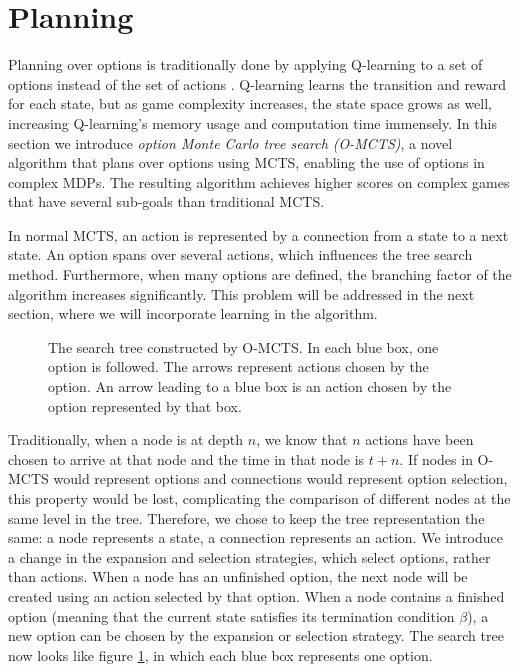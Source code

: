 \section{Planning}
\label{sec:planning}


Planning over options is traditionally done by applying Q-learning to a set of
options instead of the set of actions \cite{sutton1999between}. Q-learning
learns the transition and reward for each state, but as game complexity
increases, the state space grows as well, increasing Q-learning's memory usage
and computation time immensely. In this section we introduce \emph{option Monte
Carlo tree search (O-MCTS)}, a novel algorithm that plans over options using
MCTS, enabling the use of options in complex MDPs.  The resulting algorithm
achieves higher scores on complex games that have several sub-goals than
traditional MCTS.

In normal MCTS, an action is represented by a connection from a state to a next
state. An option spans over several actions, which influences the tree search
method. Furthermore, when many options are defined, the branching factor of the
algorithm increases significantly. This problem will be addressed in the next
section, where we will incorporate learning in the algorithm.

\begin{figure}
	\centering
	\caption{The search tree constructed by O-MCTS. In each blue box, one option
	is followed. The arrows represent actions chosen by the option. An arrow
leading to a blue box is an action chosen by the option represented by that box.}
	\label{fig:omcts-tree}
\end{figure}

Traditionally, when a node is at depth $n$, we know that $n$ actions have been
chosen to arrive at that node and the time in that node is $t+n$. If nodes in
O-MCTS would represent options and connections would represent option selection,
this property would be lost, complicating the comparison of different nodes at
the same level in the tree. Therefore, we chose to keep the tree representation
the same: a node represents a state, a connection represents an action. We
introduce a change in the expansion and selection strategies, which select
options, rather than actions. When a node has an unfinished option, the next
node will be created using an action selected by that option. When a node
contains a finished option (meaning that the current state satisfies its
termination condition $\beta$), a new option can be chosen by the expansion or
selection strategy. The search tree now looks like figure \ref{fig:omcts-tree},
in which each blue box represents one option.

